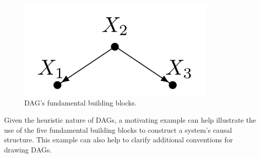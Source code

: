 \documentclass[
  authoryear,
  preprint,
  1p]{elsarticle}
\begin{document}
\begin{figure}
\begin{minipage}{0.33\linewidth}
{\includegraphics[width=0.85\textwidth,height=\textheight]{images/figures/dag_bb4.png}

}


\end{minipage}%
%
\begin{minipage}{0.33\linewidth}



\end{minipage}%

\caption{\label{fig-dags}DAG's fundamental building blocks.}

\end{figure}%

Given the heuristic nature of DAGs, a motivating example can help
illustrate the use of the five fundamental building blocks to construct
a system's causal structure. This example can also help to clarify
additional conventions for drawing DAGs.
\end{document}
